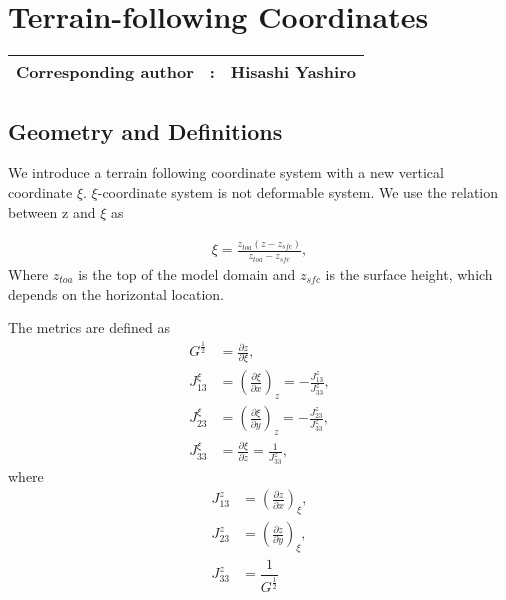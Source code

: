 \chapter{Terrain-following Coordinates}
\label{chap:terrain-following}
{\bf \Large 
\begin{tabular}{ccc}
\hline
  Corresponding author & : & Hisashi Yashiro\\
\hline
\end{tabular}
}

\section{Geometry and Definitions}
We introduce a terrain following coordinate system with a new vertical coordinate $\xi$. 
$\xi$-coordinate system is not deformable system. We use the relation between z and $\xi$ as

\begin{eqnarray}
 \xi = \frac{z_{toa}(z-z_{sfc})}{z_{toa}-z_{sfc}},
\end{eqnarray}
Where $z_{toa}$ is the top of the model domain and $z_{sfc}$ is the surface height, 
which depends on the horizontal location.

The metrics are defined as
\begin{align}
 G^{\frac{1}{2}} &= \frac{\partial z}{\partial \xi}, \\
 J^{\xi}_{13} &= \left(\frac{\partial \xi}{\partial x}\right)_{z} = -\frac{J^{z}_{13}}{J^{z}_{33}},\\
 J^{\xi}_{23} &= \left(\frac{\partial \xi}{\partial y}\right)_{z} = -\frac{J^{z}_{23}}{J^{z}_{33}},\\
 J^{\xi}_{33} &=       \frac{\partial \xi}{\partial z}            =  \frac{1}         {J^{z}_{33}},
\end{align}
where
\begin{align}
 J^{z}_{13} &= \left(\frac{\partial z}{\partial x}\right)_{\xi},\\
 J^{z}_{23} &= \left(\frac{\partial z}{\partial y}\right)_{\xi},\\
 J^{z}_{33} &= \dfrac{1}{G^{\frac{1}{2}}}
\end{align}

